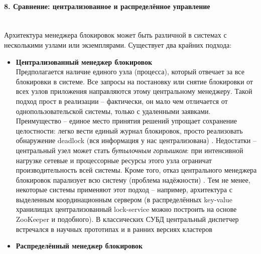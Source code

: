 \paragraph{8. Сравнение: централизованное и распределённое управление} ~\\
 Архитектура менеджера блокировок может быть различной в системах с несколькими узлами или экземплярами. Существует два крайних подхода: 
 \begin{itemize}
    \item \textbf{Централизованный менеджер блокировок} ~\\
    Предполагается наличие единого узла (процесса), который отвечает за все блокировки в системе. Все запросы на постановку или снятие блокировки от всех узлов приложения направляются этому центральному менеджеру. Такой подход прост в реализации – фактически, он мало чем отличается от однопользовательской системы, только с удаленными заявками. Преимущество – единое место принятия решений упрощает сохранение целостности: легко вести единый журнал блокировок, просто реализовать обнаружение deadlock (вся информация у нас централизована) \autocite{Silberschatz}. Недостатки – центральный узел может стать \textit{бутылочным горлышком}: при интенсивной нагрузке сетевые и процессорные ресурсы этого узла ограничат производительность всей системы. Кроме того, отказ центрального менеджера блокировок парализует всю систему (проблема надёжности) \autocite{Silberschatz}. Тем не менее, некоторые системы применяют этот подход – например, архитектура с выделенным координационным сервером (в распределённых key-value хранилищах централизованный lock-service можно построить на основе ZooKeeper и подобного). В классических СУБД центральный диспетчер встречался в научных прототипах и в ранних версиях кластеров
    \item \textbf{Распределённый менеджер блокировок} ~\\

\end{itemize}
